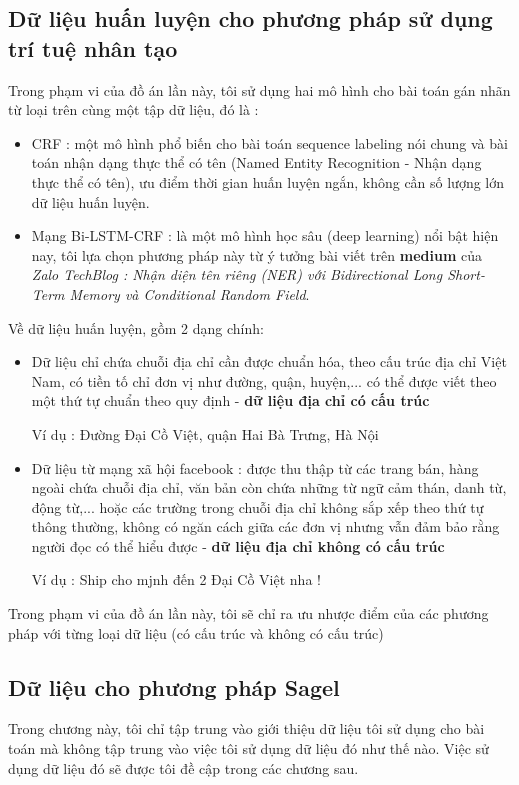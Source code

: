 \subsection{Dữ liệu huấn luyện cho phương pháp sử dụng trí tuệ nhân tạo}
Trong phạm vi của đồ án lần này, tôi sử dụng hai mô hình cho bài toán gán nhãn từ loại trên cùng một tập dữ liệu, đó là :
\begin{itemize}
    \item CRF : một mô hình phổ biến cho bài toán sequence labeling nói chung và bài toán nhận dạng thực thể có tên (Named Entity Recognition - Nhận dạng thực thể có tên), ưu điểm thời gian huấn luyện ngắn, không cần số lượng lớn dữ liệu huấn luyện.
    \item Mạng Bi-LSTM-CRF : là một mô hình học sâu (deep learning) nổi bật hiện nay, tôi lựa chọn phương pháp này từ ý tưởng bài viết trên \textbf{medium} của \textit{Zalo TechBlog : Nhận diện tên riêng (NER) với Bidirectional Long Short-Term Memory và Conditional Random Field}.
\end{itemize}

Về dữ liệu huấn luyện, gồm 2 dạng chính:
\begin{itemize}
    \item Dữ liệu chỉ chứa chuỗi địa chỉ cần được chuẩn hóa, theo cấu trúc địa chỉ Việt Nam, có tiền tố chỉ đơn vị như đường, quận, huyện,... có thể được viết theo một thứ tự chuẩn theo quy định - \textbf{dữ liệu địa chỉ có cấu trúc}
    
    Ví dụ : Đường Đại Cồ Việt, quận Hai Bà Trưng, Hà Nội
    \item Dữ liệu từ mạng xã hội facebook : được thu thập từ các trang bán, hàng ngoài chứa chuỗi địa chỉ, văn bản còn chứa những từ ngữ cảm thán, danh từ, động từ,... hoặc các trường trong chuỗi địa chỉ không sắp xếp theo thứ tự thông thường, không có ngăn cách giữa các đơn vị nhưng vẫn đảm bảo rằng người đọc có thể hiểu được - \textbf{dữ liệu địa chỉ không có cấu trúc}
    
    Ví dụ : Ship cho mjnh đến 2 Đại Cồ Việt nha !
\end{itemize}
Trong phạm vi của đồ án lần này, tôi sẽ chỉ ra ưu nhược điểm của các phương pháp với từng loại dữ liệu (có cấu trúc và không có cấu trúc)

\newpage
\subsection{Dữ liệu cho phương pháp Sagel}
Trong chương này, tôi chỉ tập trung vào giới thiệu dữ liệu tôi sử dụng cho bài toán mà không tập trung vào việc tôi sử dụng dữ liệu đó như thế nào. Việc sử dụng dữ liệu đó sẽ được tôi đề cập trong các chương sau.

